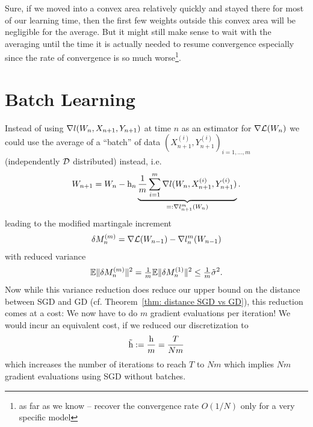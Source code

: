 Sure, if we moved into a convex area relatively quickly and stayed there for
most of our learning time, then the first few weights outside this convex
area will be negligible for the average.
But it might still make sense to wait with the averaging until the time it is
actually needed to resume convergence especially since the rate of convergence
is so much worse\footnote{
	as far as we know -- \textcite{bachNonstronglyconvexSmoothStochastic2013}
	recover the convergence rate \(O(1/N)\) only for a very specific model
}.

\section{Batch Learning}

Instead of using \(\nabla l(W_n, X_{n+1}, Y_{n+1})\) at time \(n\) as an
estimator for \(\nabla\mathcal{L}(W_n)\) we could use the average of a
``batch'' of data \((X^{(i)}_{n+1}, Y^{(i)}_{n+1})_{i=1,\dots,m}\) (independently
\(\mathcal{D}\) distributed) instead, i.e.
\begin{align*}
	W_{n+1} = W_n
	-\text{h}_n \underbrace{\frac1{m}\sum_{i=1}^m\nabla l(W_n,X^{(i)}_{n+1}, Y^{(i)}_{n+1})}_{
		=:\nabla l_{n+1}^m(W_n)
	}.
\end{align*}
leading to the modified martingale increment
\begin{align*}
	\delta M_n^{(m)}
	= \nabla\mathcal{L}(W_{n-1})
	- \nabla l_n^m(W_{n-1})
\end{align*}
with reduced variance
\begin{align*}
	\mathbb{E}\|\delta M_n^{(m)}\|^2 = \tfrac1m\mathbb{E}\|\delta M_n^{(1)}\|^2 \le \tfrac1m \tilde{\sigma}^2.
\end{align*}
Now while this variance reduction does reduce our upper bound on the distance
between SGD and GD (cf. Theorem~\ref{thm: distance SGD vs GD}), this reduction
comes at a cost: We now have to do \(m\) gradient evaluations per iteration!
We would incur an equivalent cost, if we reduced our discretization to
\begin{align*}
	\tilde{\text{h}}:=\frac{\text{h}}{m}=\frac{T}{Nm}
\end{align*}
which increases the number of iterations to reach \(T\) to \(Nm\) which implies
\(Nm\) gradient evaluations using SGD without batches.

